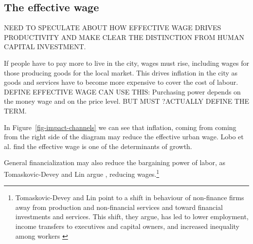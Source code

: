 \subsection{The effective wage}

{\color{red} NEED TO SPECULATE ABOUT HOW EFFECTIVE WAGE DRIVES PRODUCTIVITY AND MAKE CLEAR THE DISTINCTION FROM HUMAN CAPITAL INVESTMENT. } 

If people have to pay more to live in the city, wages must rise, including wages for those producing goods for the local market. This drives inflation in the city
as goods and services have to become more expensive to cover the cost of labour. DEFINE EFFECTIVE WAGE CAN USE THIS: Purchasing power depends on the money wage and on the price level. BUT MUST ?ACTUALLY DEFINE THE TERM.


In Figure~\ref{fig-impact-channels} we can see that inflation, coming from coming from the right side of the diagram may reduce the effective urban wage. Lobo et al. find the effective wage is one of the determinants of growth.  


General financialization may also reduce the bargaining power of labor, as Tomaskovic-Devey and Lin argue \cite{tomaskovic-deveyFinancializationCausesInequality2013}, reducing wages.\footnote{Tomaskovic-Devey and Lin point to a shift in behaviour of non-finance firms away from production and non-financial services and toward financial investments and services. This shift, they argue, has led to lower employment, income transfers to executives and capital owners, and increased inequality among workers \cite{tomaskovic-deveyFinancializationCausesInequality2013}}


